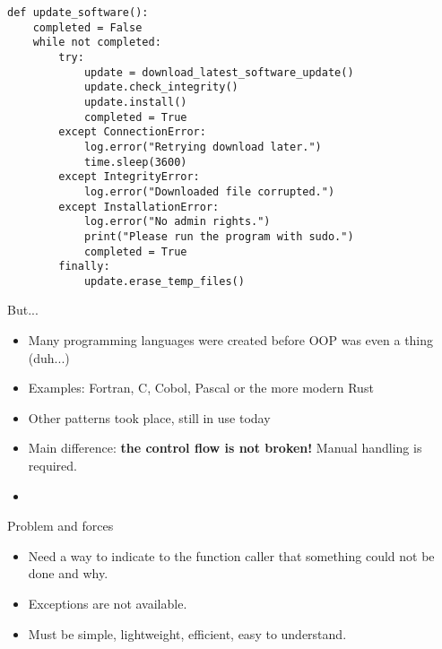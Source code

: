 \documentclass[aspectratio=169,14pt]{beamer}
\begin{document}
\begin{frame}[fragile]{}
\begin{lstlisting}[style=pythonstyle]
def update_software():
    completed = False
    while not completed:
        try:
            update = download_latest_software_update()
            update.check_integrity()
            update.install()
            completed = True
        except ConnectionError:
            log.error("Retrying download later.")
            time.sleep(3600)
        except IntegrityError:
            log.error("Downloaded file corrupted.")
        except InstallationError:
            log.error("No admin rights.")
            print("Please run the program with sudo.")
            completed = True
        finally:
            update.erase_temp_files()
\end{lstlisting}
\end{frame}



\begin{frame}{But...}
\begin{itemize}
    \item Many programming languages were created before OOP was even a thing (duh...)
    \item Examples: Fortran, C, Cobol, Pascal or the more modern Rust
    \item Other patterns took place, still in use today
    \item Main difference: \textbf{the control flow is not broken!} Manual handling is required.
    \item \textit{}
\end{itemize}
\end{frame}



\begin{frame}{Problem and forces}
\begin{itemize}
    \item Need a way to indicate to the function caller that something could not be done and why.
    \item Exceptions are not available.
    \item Must be simple, lightweight, efficient, easy to understand.
\end{itemize}
\end{frame}
\end{document}
